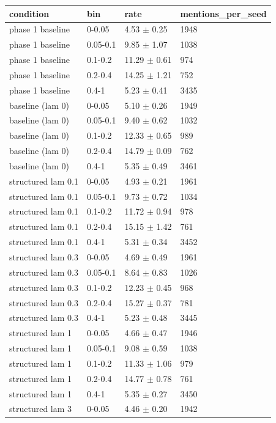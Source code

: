 \begin{tabular}{llll}
\hline
condition & bin & rate & mentions\_per\_seed \\
\hline
phase 1 baseline & 0-0.05 & 4.53 $\pm$ 0.25 & 1948 \\
phase 1 baseline & 0.05-0.1 & 9.85 $\pm$ 1.07 & 1038 \\
phase 1 baseline & 0.1-0.2 & 11.29 $\pm$ 0.61 & 974 \\
phase 1 baseline & 0.2-0.4 & 14.25 $\pm$ 1.21 & 752 \\
phase 1 baseline & 0.4-1 & 5.23 $\pm$ 0.41 & 3435 \\
baseline (lam 0) & 0-0.05 & 5.10 $\pm$ 0.26 & 1949 \\
baseline (lam 0) & 0.05-0.1 & 9.40 $\pm$ 0.62 & 1032 \\
baseline (lam 0) & 0.1-0.2 & 12.33 $\pm$ 0.65 & 989 \\
baseline (lam 0) & 0.2-0.4 & 14.79 $\pm$ 0.09 & 762 \\
baseline (lam 0) & 0.4-1 & 5.35 $\pm$ 0.49 & 3461 \\
structured lam 0.1 & 0-0.05 & 4.93 $\pm$ 0.21 & 1961 \\
structured lam 0.1 & 0.05-0.1 & 9.73 $\pm$ 0.72 & 1034 \\
structured lam 0.1 & 0.1-0.2 & 11.72 $\pm$ 0.94 & 978 \\
structured lam 0.1 & 0.2-0.4 & 15.15 $\pm$ 1.42 & 761 \\
structured lam 0.1 & 0.4-1 & 5.31 $\pm$ 0.34 & 3452 \\
structured lam 0.3 & 0-0.05 & 4.69 $\pm$ 0.49 & 1961 \\
structured lam 0.3 & 0.05-0.1 & 8.64 $\pm$ 0.83 & 1026 \\
structured lam 0.3 & 0.1-0.2 & 12.23 $\pm$ 0.45 & 968 \\
structured lam 0.3 & 0.2-0.4 & 15.27 $\pm$ 0.37 & 781 \\
structured lam 0.3 & 0.4-1 & 5.23 $\pm$ 0.48 & 3445 \\
structured lam 1 & 0-0.05 & 4.66 $\pm$ 0.47 & 1946 \\
structured lam 1 & 0.05-0.1 & 9.08 $\pm$ 0.59 & 1038 \\
structured lam 1 & 0.1-0.2 & 11.33 $\pm$ 1.06 & 979 \\
structured lam 1 & 0.2-0.4 & 14.77 $\pm$ 0.78 & 761 \\
structured lam 1 & 0.4-1 & 5.35 $\pm$ 0.27 & 3450 \\
structured lam 3 & 0-0.05 & 4.46 $\pm$ 0.20 & 1942 \\

\end{tabular}
